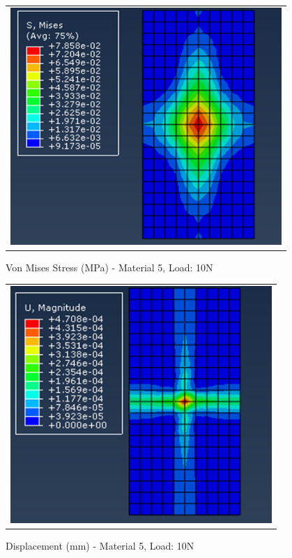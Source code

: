 \documentclass[a4paper,12pt]{article}
\numberwithin{equation}{section}
\numberwithin{figure}{section}
\begin{document}
\begin{figure}[H]
  \centering
  \begin{tabular}{@{}c@{}}
    \includegraphics[width=0.7\linewidth,height=255pt]{Results/Point Loading/M5_VMS_L2.png} \\
  \end{tabular}
  \caption{Von Mises Stress (MPa) - Material 5, Load: 10N}
\end{figure}

\begin{figure}[H]
  \centering
  \begin{tabular}{@{}c@{}}
    \includegraphics[width=0.7\linewidth,height=255pt]{Results/Point Loading/M5_DIS_L2.png} \\
  \end{tabular}
  \caption{Displacement (mm) - Material 5, Load: 10N}
\end{figure}
\end{document}
